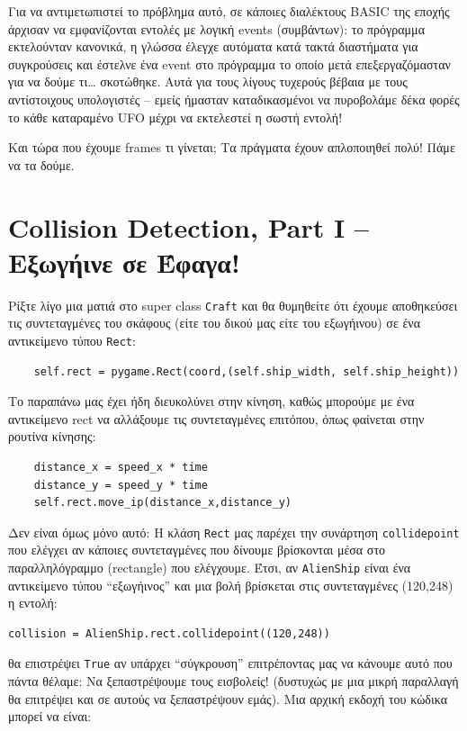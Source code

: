 Για να αντιμετωπιστεί το πρόβλημα αυτό, σε κάποιες διαλέκτους BASIC της εποχής άρχισαν να εμφανίζονται εντολές με λογική events (συμβάντων): το πρόγραμμα εκτελούνταν κανονικά, η γλώσσα έλεγχε αυτόματα κατά τακτά διαστήματα για συγκρούσεις και έστελνε ένα event στο πρόγραμμα το οποίο μετά επεξεργαζόμασταν  για να δούμε τι\ldots{} σκοτώθηκε.  Αυτά για τους λίγους τυχερούς βέβαια  με τους αντίστοιχους υπολογιστές -- εμείς ήμασταν καταδικασμένοι να πυροβολάμε δέκα φορές το κάθε καταραμένο UFO μέχρι να εκτελεστεί η σωστή εντολή!

Και τώρα που έχουμε frames τι γίνεται; Τα πράγματα έχουν απλοποιηθεί πολύ! Πάμε να τα δούμε.
%
\section{Collision Detection, Part I -- Εξωγήινε σε Έφαγα!}
%
Ρίξτε λίγο μια ματιά στο super class {\tt Craft} και θα θυμηθείτε ότι έχουμε αποθηκεύσει τις συντεταγμένες του σκάφους (είτε του δικού μας είτε του εξωγήινου) σε ένα αντικείμενο τύπου {\tt Rect}:

\begin{verbatim}
    self.rect = pygame.Rect(coord,(self.ship_width, self.ship_height))
\end{verbatim}

Το παραπάνω μας έχει ήδη διευκολύνει στην κίνηση, καθώς μπορούμε με ένα αντικείμενο rect να αλλάξουμε τις συντεταγμένες επιτόπου, όπως φαίνεται στην ρουτίνα κίνησης:

\begin{verbatim}
    distance_x = speed_x * time
    distance_y = speed_y * time
    self.rect.move_ip(distance_x,distance_y)
\end{verbatim}

Δεν είναι όμως μόνο αυτό: Η κλάση {\tt Rect} μας παρέχει την συνάρτηση {\tt collidepoint} που ελέγχει αν κάποιες συντεταγμένες που δίνουμε βρίσκονται μέσα στο παραλληλόγραμμο (rectangle) που ελέγχουμε. Έτσι, αν {\tt AlienShip} είναι ένα αντικείμενο τύπου ``εξωγήινος'' και μια βολή βρίσκεται στις συντεταγμένες (120,248) η εντολή:

\begin{verbatim}
collision = AlienShip.rect.collidepoint((120,248))
\end{verbatim}

θα επιστρέψει {\tt True} αν υπάρχει ``σύγκρουση'' επιτρέποντας μας να κάνουμε αυτό που πάντα θέλαμε: Να ξεπαστρέψουμε τους εισβολείς! (δυστυχώς με μια μικρή παραλλαγή θα επιτρέψει και σε αυτούς να ξεπαστρέψουν εμάς). Μια αρχική εκδοχή του κώδικα μπορεί να είναι:

